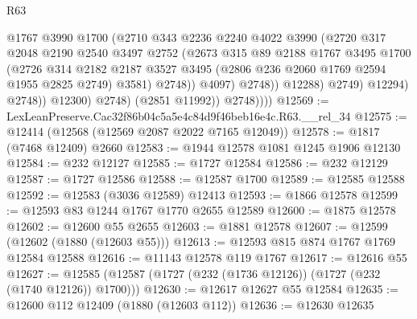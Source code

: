 \begin{lexlean}{R63}
\begin{coremodule}
                                @1767
                                @3990
                                @1700
                                (@2710
                                  @343
                                  @2236
                                  @2240
                                  @4022
                                  @3990
                                  (@2720
                                    @317
                                    @2048
                                    @2190
                                    @2540
                                    @3497
                                    @2752
                                    (@2673
                                      @315
                                      @89
                                      @2188
                                      @1767
                                      @3495
                                      @1700
                                      (@2726
                                        @314
                                        @2182
                                        @2187
                                        @3527
                                        @3495
                                        (@2806 @236 @2060 @1769 @2594 @1955 @2825 @2749)
                                        @3581)
                                      @2748))
                                  @4097)
                                @2748))
                            @12288)
                          @2749)
                        @12294)
                      @2748))
                  @12300)
                @2748)
              (@2851 @11992))
            @2748))))
@12569 := LexLeanPreserve.Cac32f86b04c5a5e4c84d9f46beb16e4c.R63.__rel_34
@12575 := @12414 (@12568 (@12569 @2087 @2022 @7165 @12049))
@12578 := @1817 (@7468 @12409) @2660
@12583 := @1944 @12578 @1081 @1245 @1906 @12130
@12584 := @232 @12127
@12585 := @1727 @12584
@12586 := @232 @12129
@12587 := @1727 @12586
@12588 := @12587 @1700
@12589 := @12585 @12588
@12592 := @12583 (@3036 @12589) @12413
@12593 := @1866 @12578
@12599 := @12593 @83 @1244 @1767 @1770 @2655 @12589
@12600 := @1875 @12578
@12602 := @12600 @55 @2655
@12603 := @1881 @12578
@12607 := @12599 (@12602 (@1880 (@12603 @55)))
@12613 := @12593 @815 @874 @1767 @1769 @12584 @12588
@12616 := @11143 @12578 @119 @1767
@12617 := @12616 @55
@12627 := @12585 (@12587 (@1727 (@232 (@1736 @12126)) (@1727 (@232 (@1740 @12126)) @1700)))
@12630 := @12617 @12627 @55 @12584
@12635 := @12600 @112 @12409 (@1880 (@12603 @112))
@12636 := @12630 @12635

\end{coremodule}
\end{lexlean}
